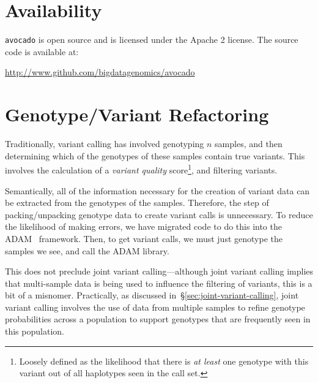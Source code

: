 \documentclass{acm_proc_article-sp}
\begin{document}
\appendix

\section{Availability}
\label{sec:availability}

\texttt{avocado} is open source and is licensed under the Apache 2 license. The source code is available at:

\url{http://www.github.com/bigdatagenomics/avocado}

\section{Genotype/Variant Refactoring}
\label{sec:genotype-variant-refactoring}

Traditionally, variant calling has involved genotyping $n$ samples, and then determining which of the genotypes of these samples
contain true variants. This involves the calculation of a \textit{variant quality} score\footnote{Loosely defined as the likelihood that
there is \emph{at least} one genotype with this variant out of all haplotypes seen in the call set.}, and filtering variants.

Semantically, all of the information necessary for the creation of variant data can be extracted from the genotypes of the samples.
Therefore, the step of packing/unpacking genotype data to create variant calls is unnecessary. To reduce the likelihood of making
errors, we have migrated code to do this into the ADAM~\cite{massie13} framework. Then, to get variant calls, we must just genotype
the samples we see, and call the ADAM library.

This does not preclude joint variant calling---although joint variant calling implies that multi-sample data is being used to influence
the filtering of variants, this is a bit of a misnomer. Practically, as discussed in~\S\ref{sec:joint-variant-calling}, joint variant calling
involves the use of data from multiple samples to refine genotype probabilities across a population to support genotypes that are
frequently seen in this population.

%

  

\balancecolumns
\end{document}
